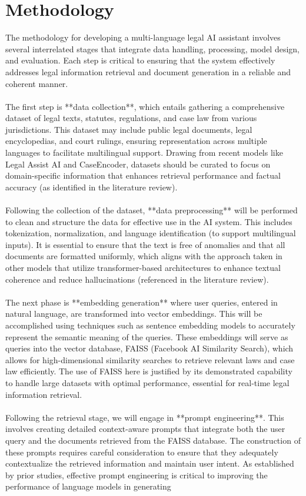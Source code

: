 \documentclass[conference]{IEEEtran}
\begin{document}
\section{Methodology}
\hspace{}The methodology for developing a multi-language legal AI assistant involves several interrelated stages that integrate data handling, processing, model design, and evaluation. Each step is critical to ensuring that the system effectively addresses legal information retrieval and document generation in a reliable and coherent manner.\\\\The first step is **data collection**, which entails gathering a comprehensive dataset of legal texts, statutes, regulations, and case law from various jurisdictions. This dataset may include public legal documents, legal encyclopedias, and court rulings, ensuring representation across multiple languages to facilitate multilingual support. Drawing from recent models like Legal Assist AI and CaseEncoder, datasets should be curated to focus on domain-specific information that enhances retrieval performance and factual accuracy (as identified in the literature review). \\\\Following the collection of the dataset, **data preprocessing** will be performed to clean and structure the data for effective use in the AI system. This includes tokenization, normalization, and language identification (to support multilingual inputs). It is essential to ensure that the text is free of anomalies and that all documents are formatted uniformly, which aligns with the approach taken in other models that utilize transformer-based architectures to enhance textual coherence and reduce hallucinations (referenced in the literature review).\\\\The next phase is **embedding generation** where user queries, entered in natural language, are transformed into vector embeddings. This will be accomplished using techniques such as sentence embedding models to accurately represent the semantic meaning of the queries. These embeddings will serve as queries into the vector database, FAISS (Facebook AI Similarity Search), which allows for high-dimensional similarity searches to retrieve relevant laws and case law efficiently. The use of FAISS here is justified by its demonstrated capability to handle large datasets with optimal performance, essential for real-time legal information retrieval.\\\\Following the retrieval stage, we will engage in **prompt engineering**. This involves creating detailed context-aware prompts that integrate both the user query and the documents retrieved from the FAISS database. The construction of these prompts requires careful consideration to ensure that they adequately contextualize the retrieved information and maintain user intent. As established by prior studies, effective prompt engineering is critical to improving the performance of language models in generating 
\end{document}
